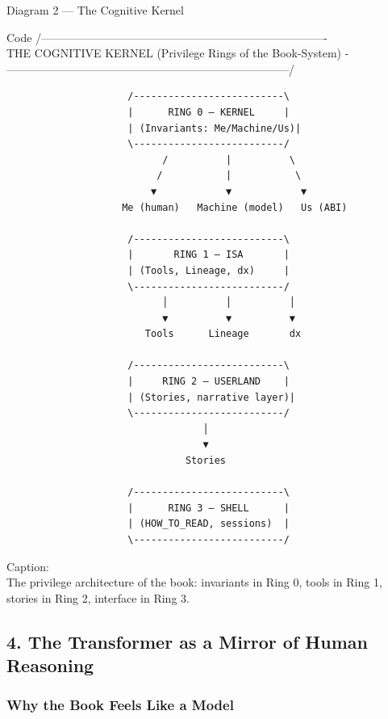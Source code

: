 Diagram 2 --- The Cognitive Kernel

Code
/----------------------------------------------------------------------------\\
\textbar{} THE COGNITIVE KERNEL \textbar{} \textbar{} (Privilege Rings
of the Book-System) \textbar{}
-\/---------------------------------------------------------------------------/

\begin{verbatim}
                     /--------------------------\
                     |      RING 0 — KERNEL     |
                     | (Invariants: Me/Machine/Us)|
                     \--------------------------/
                           /          |          \
                          /           |           \
                         ▼            ▼            ▼
                    Me (human)   Machine (model)   Us (ABI)

                     /--------------------------\
                     |       RING 1 — ISA       |
                     | (Tools, Lineage, dx)     |
                     \--------------------------/
                           │          │          │
                           ▼          ▼          ▼
                        Tools      Lineage       dx

                     /--------------------------\
                     |     RING 2 — USERLAND    |
                     | (Stories, narrative layer)|
                     \--------------------------/
                                  │
                                  ▼
                               Stories

                     /--------------------------\
                     |      RING 3 — SHELL      |
                     | (HOW_TO_READ, sessions)  |
                     \--------------------------/
\end{verbatim}

Caption:\\
The privilege architecture of the book: invariants in Ring 0, tools in
Ring 1, stories in Ring 2, interface in Ring 3.

\hypertarget{the-transformer-as-a-mirror-of-human-reasoning}{%
\subsection{4. The Transformer as a Mirror of Human
Reasoning}\label{the-transformer-as-a-mirror-of-human-reasoning}}

\hypertarget{why-the-book-feels-like-a-model}{%
\subsubsection{Why the Book Feels Like a
Model}\label{why-the-book-feels-like-a-model}}

